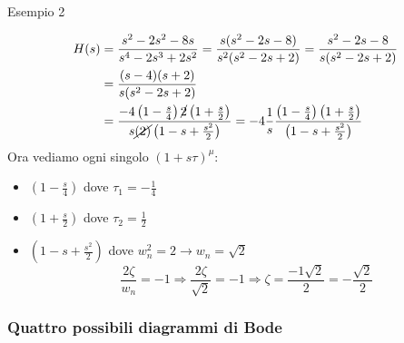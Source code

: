 \documentclass[a4paper]{article}
\begin{document}
\begin{examplebox}{Esempio 2}
    
    \begin{align*}
        H(s) &= \frac{s^2-2s^2-8s}{s^4 - 2s^3 + 2s^2} = \frac{s(s^2-2s-8)}{s^2(s^2-2s+2)} = \frac{s^2-2s-8}{s(s^2-2s+2)}\\
        &= \frac{(s-4)(s+2)}{s(s^2-2s+2)}\\
        &= \frac{-4\left(1 - \frac{s}{4}\right)\cancel{2}\left(1 + \frac{s}{2}\right)}{s\cancel{(2)}\left(1 - s + \frac{s^2}{2}\right)} = -4\frac{1}{s}\frac{\left(1 - \frac{s}{4}\right)\left(1 + \frac{s}{2}\right)}{\left(1 - s + \frac{s^2}{2}\right)}\\
    \end{align*}
    Ora vediamo ogni singolo $(1 + s\tau)^{\mu}$:
    \begin{itemize}
        \item $\left(1 - \frac{s}{4}\right)$ dove $\tau_1 = -\frac{1}{4}$
        \item $\left(1 + \frac{s}{2}\right)$ dove $\tau_2 = \frac{1}{2}$
        \item $\left(1 - s + \frac{s^2}{2}\right)$ dove $w_n^2 = 2 \rightarrow w_n = \sqrt{2}$
        \[\frac{2\zeta}{w_n} = -1 \Longrightarrow \frac{2\zeta}{\sqrt{2}} = -1 \Longrightarrow \zeta = \frac{-1\sqrt{2}}{2} = -\frac{\sqrt{2}}{2}\]
    \end{itemize}
   
\end{examplebox}

\subsubsection{Quattro possibili diagrammi di Bode}
\end{document}
